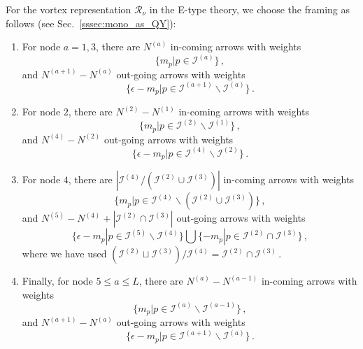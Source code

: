 \documentclass[12pt,a4paper]{article}
\renewcommand{\(}{\left(}
\renewcommand{\)}{\right)}
\newcommand{\eps}{\epsilon}
\renewcommand{\(}{\left(}
\renewcommand{\)}{\right)}
\begin{document}
For the vortex representation $\mathcal{R}_\nu$ in the E-type theory, we choose the framing as follows (see Sec.~\ref{sssec:mono_as_QY}):
\begin{enumerate}
\item For node $a=1,3$, there are $N^{(a)}$ in-coming arrows with weights
\begin{equation}\{m_p|p\in\mathcal{I}^{(a)}\}\,,\end{equation}
and $N^{(a+1)}-N^{(a)}$ out-going arrows with weights
\begin{equation}
\{\epsilon-m_p|p\in\mathcal{I}^{(a+1)}\backslash\mathcal{I}^{(a)} \}\,.
\end{equation}

\item For node $2$, there are $N^{(2)}-N^{(1)}$ in-coming arrows with weights \begin{equation}\{m_p|p\in\mathcal{I}^{(2)}\backslash\mathcal{I}^{(1)}\}\,,\end{equation} and $N^{(4)}-N^{(2)}$ out-going arrows with weights
\begin{equation}\{\epsilon-m_p|p\in \mathcal{I}^{(4)}\backslash\mathcal{I}^{(2)}\}\,.\end{equation}

\item For node $4$, there are $|\mathcal{I}^{(4)}/(\mathcal{I}^{(2)}\cup \mathcal{I}^{(3)})|$ in-coming arrows with weights
\begin{equation}\{m_p|p\in \mathcal{I}^{(4)}\backslash(\mathcal{I}^{(2)}\cup \mathcal{I}^{(3)})\}\,,\end{equation}
and $N^{(5)}-N^{(4)}+|\mathcal{I}^{(2)}\cap\mathcal{I}^{(3)}|$ out-going arrows with weights
\begin{equation}\{\epsilon-m_p|p\in \mathcal{I}^{(5)}\backslash\mathcal{I}^{(4)} \}\bigcup\{-m_p|p\in \mathcal{I}^{(2)}\cap\mathcal{I}^{(3)}\}\,,\end{equation}where we have used $(\mathcal{I}^{(2)}\sqcup\mathcal{I}^{(3)})/\mathcal{I}^{(4)}=\mathcal{I}^{(2)}\cap\mathcal{I}^{(3)}\,$.
    
\item Finally, for node $5\leq a\leq L$, there are $N^{(a)}-N^{(a-1)}$ in-coming arrows with weights \begin{equation}\{m_p|p\in \mathcal{I}^{(a)}\backslash\mathcal{I}^{(a-1)}\}\,,\end{equation}
and $N^{(a+1)}-N^{(a)}$ out-going arrows with weights
\begin{equation}\{\eps-m_p|p\in \mathcal{I}^{(a+1)}\backslash\mathcal{I}^{(a)}\}\,.\end{equation}
\end{enumerate}
\end{document}

